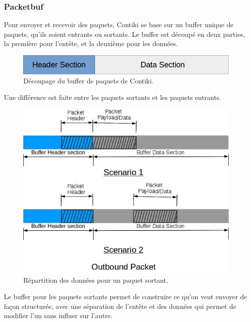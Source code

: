 		\subsubsection{Packetbuf}
		
			Pour envoyer et recevoir des paquets, Contiki se base sur un buffer unique de paquets, qu'ils soient entrants ou sortants.
			Le buffer est découpé en deux parties, la première pour l'entête, et la deuxième pour les données.
			
			\begin{figure}[htp]
				\centering
				\includegraphics[width=12cm]{images/Buf.jpg}
				\caption{Découpage du buffer de paquets de Contiki.}
				\label{fig:buf}
			\end{figure}
			
			Une différence est faite entre les paquets sortants et les paquets entrants.
			
			\clearpage
			\begin{figure}[htp]
				\centering
				\includegraphics[width=13cm]{images/Out.jpg}
				\caption{Répartition des données pour un paquet sortant.}
				\label{fig:outbuf}
			\end{figure}
			
			
			Le buffer pour les paquets sortants permet de construire ce qu'on veut envoyer de façon structurée, avec une séparation de l'entête et des données qui permet de modifier l'un sans influer sur l'autre. 
			
